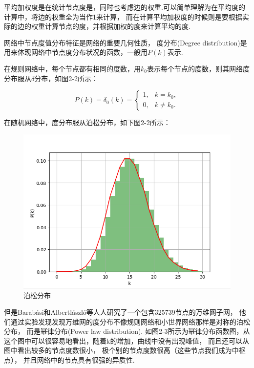 \documentclass[bachelor,adobefonts]{jnuthesis}
\begin{document}
平均加权度是在统计节点度是，同时也考虑边的权重.可以简单理解为在平均度的计算中，将边的权重全为当作1来计算，
而在计算平均加权度的时候则是要根据实际的边的权重计算节点的度，并根据加权的度来计算平均的度.

网络中节点度值分布特征是网络的重要几何性质，
度分布(Degree distribution)是用来体现网络中节点度分布状况的函数，一般用$P(k)$表示.

在规则网络中，每个节点都有相同的度数，用$k_0$表示每个节点的度数，则其网络度分布服从$\delta$分布，如图2-2所示：

\begin{equation}
  P(k) = \delta_0(k) = 
  \left\{
    \begin{array}{lr}
      1, & k = k_0,\\
      0, & k\neq k_0.
    \end{array}
  \right.
\end{equation}

在随机网络\cite{Erdos1959On}中，度分布服从泊松分布，如下图2-2所示：
\begin{figure}[h!]
  \centering
  \includegraphics[width=0.6\linewidth]{Wposong.png}
  \caption{泊松分布}
\end{figure}

但是Barabási和Albertlászló等人\cite{Barab1999Emergence}人研究了一个包含325739节点的万维网子网，
他们通过实验发现发现万维网的度分布不像规则网络和小世界网络\cite{Watts1998Collective, Newman2000Mean}那样是对称的泊松分布，
而是幂律分布(Power law distribution).
如图2-3所示为幂律分布函数图，从这个图中可以很容易地看出，随着k的增加，曲线中没有出现峰值，
而且还可以从图中看出较多的节点度数很小，
极个别的节点度数很高（这些节点我们成为中枢点），
并且网络中的节点具有很强的异质性.
\end{document}
